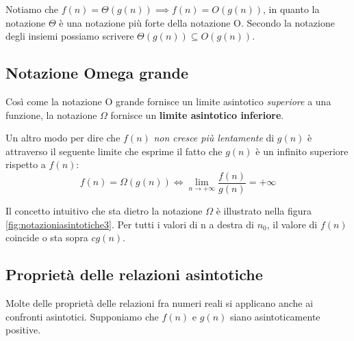 \begin{osservation}
	Notiamo che $f(n)=\Theta(g(n)) \implies f(n)=O(g(n))$, in quanto la notazione $\Theta$ è una notazione più forte della notazione O. Secondo la notazione degli insiemi possiamo scrivere $\Theta(g(n)) \subseteq O(g(n))$.
\end{osservation}

\subsection{Notazione Omega grande}
Così come la notazione O grande fornisce un limite asintotico \textit{superiore} a una funzione, la notazione $\Omega$ fornisce un \textbf{limite asintotico inferiore}.


Un altro modo per dire che $f(n)$ \textit{non cresce più lentamente} di $g(n)$ è attraverso il seguente limite che esprime il fatto che $g(n)$ è un infinito superiore rispetto a $f(n)$:
\begin{equation}
	f(n)=\Omega(g(n)) \iff \lim_{n \to +\infty} \frac{f(n)}{g(n)}= + \infty
\end{equation}

Il concetto intuitivo che sta dietro la notazione $\Omega$ è illustrato nella figura \ref{fig:notazioniasintotiche3}. Per tutti i valori di n a destra di $n_{0}$, il valore di $f(n)$ coincide o sta sopra $cg(n)$.

\subsection{Proprietà delle relazioni asintotiche}
Molte delle proprietà delle relazioni fra numeri reali si applicano anche ai confronti asintotici. Supponiamo che $f(n)$ e $g(n)$ siano asintoticamente positive.

